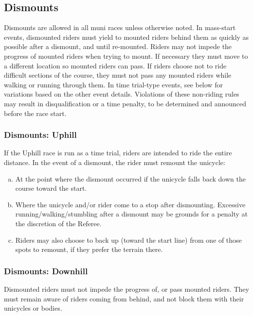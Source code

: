 \subsection{Dismounts}
Dismounts are allowed in all muni races unless otherwise noted.
In mass-start events, dismounted riders must yield to mounted riders behind them as quickly as possible after a dismount, and until re-mounted.
Riders may not impede the progress of mounted riders when trying to mount.
If necessary they must move to a different location so mounted riders can pass.
If riders choose not to ride difficult sections of the course, they must not pass any mounted riders while walking or running through them.
In time trial-type events, see below for variations based on the other event details.
Violations of these non-riding rules may result in disqualification or a time penalty, to be determined and announced before the race start.

\subsubsection{Dismounts: Uphill}
If the Uphill race is run as a time trial, riders are intended to ride the entire distance.
In the event of a dismount, the rider must remount the unicycle:
\begin{enumerate}[(a)]
\item At the point where the dismount occurred if the unicycle falls back down the course toward the start.
\item Where the unicycle and/or rider come to a stop after dismounting.
Excessive running/walking/stumbling after a dismount may be grounds for a
penalty at the discretion of the Referee.
\item Riders may also choose to back up (toward the start line) from one of those spots to remount, if they prefer the terrain there.
\end{enumerate}

\subsubsection{Dismounts: Downhill}

Dismounted riders must not impede the progress of, or pass mounted riders.
They must remain aware of riders coming from behind, and not block them with their
unicycles or bodies.

